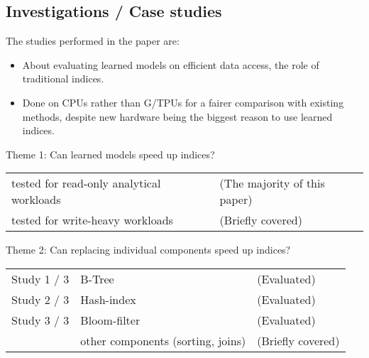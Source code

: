 \documentclass[presentation]{beamer}
\begin{document}
\subsection{Investigations / Case studies}
\label{sec:org91dffd9}
The studies performed in the paper are:
\begin{itemize}
\item About evaluating learned models on \alert{efficient data access}, the role of traditional indices.
\item Done on CPUs rather than G/TPUs for a fairer comparison with existing methods, despite new hardware being the biggest reason to use learned indices.
\end{itemize}

\begin{frame}[label={sec:orgdeee86e}]{Theme 1: Can learned models speed up indices?}
\begin{center}
\begin{tabular}{ll}
tested for read-only analytical workloads & (The majority of this paper)\\
tested for write-heavy workloads & (Briefly covered)\\
\end{tabular}
\end{center}
\end{frame}

\begin{frame}[label={sec:org546f684}]{Theme 2: Can replacing individual components speed up indices?}
\begin{center}
\begin{tabular}{lll}
Study 1 / 3 & B-Tree & (Evaluated)\\
Study 2 / 3 & Hash-index & (Evaluated)\\
Study 3 / 3 & Bloom-filter & (Evaluated)\\
 & other components (sorting, joins) & (Briefly covered)\\
\end{tabular}
\end{center}
\end{frame}
\end{document}
